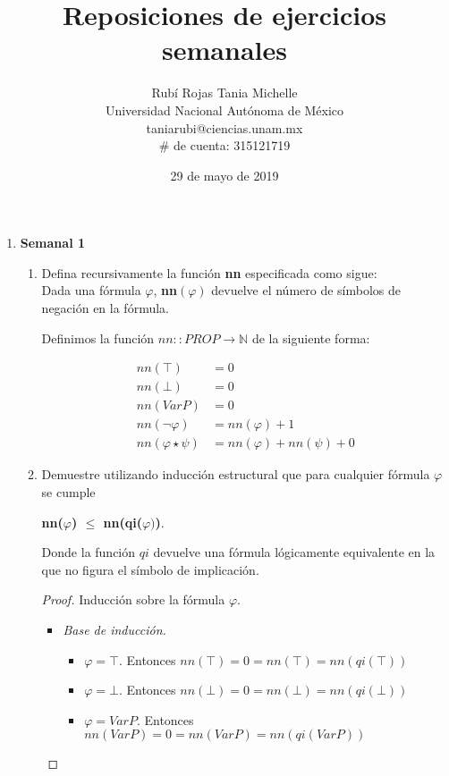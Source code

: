 \documentclass[letterpaper,12pt]{article}
\title{Reposiciones de ejercicios semanales}
\author{Rubí Rojas Tania Michelle \\
        Universidad Nacional Autónoma de México \\
        taniarubi@ciencias.unam.mx \\
        $\#$ de cuenta: 315121719}
\date{29 de mayo de 2019}
\begin{document}
\maketitle

\begin{enumerate}
    \item \textbf{Semanal 1}
    
    \begin{enumerate}
        \item Defina recursivamente la función \textbf{nn} especificada como
        sigue: \\
        Dada una fórmula $\varphi$, \textbf{nn}$(\varphi)$ devuelve el número de
        símbolos de negación en la fórmula. 

         Definimos la función $nn :: PROP \rightarrow \mathbb{N}$
        de la siguiente forma:
        
        \begin{align*}
            nn(\top) &= 0 \\
            nn(\bot) &= 0 \\
            nn(Var P) &= 0 \\
            nn(\neg \varphi) &= nn(\varphi) + 1\\
            nn(\varphi \star \psi) &= nn(\varphi) + nn(\psi) + 0
        \end{align*}
        
        \item Demuestre utilizando inducción estructural que para cualquier 
        fórmula $\varphi$ se cumple 

        \begin{center}
            \textbf{nn($\varphi$) $\leq$ nn(qi($\varphi)$)}. 
        \end{center}

        Donde la función $qi$ devuelve una fórmula lógicamente equivalente en 
        la que no figura el símbolo de implicación.

        \begin{proof}
            Inducción sobre la fórmula $\varphi$.
            
            \begin{itemize}
                \item \textit{Base de inducción.}
                
                \begin{itemize}
                    \item $\varphi = \top$. Entonces 
                    $nn(\top) = 0 = nn(\top) = nn(qi(\top))$
                    \item $\varphi = \bot$. Entonces 
                    $nn(\bot) = 0 = nn(\bot) = nn(qi(\bot))$
                    \item $\varphi = Var P$. Entonces
                    $nn(Var P) = 0 = nn(Var P) = nn(qi(Var P))$  
                \end{itemize}


\end{itemize}
\end{proof}
\end{enumerate}
\end{enumerate}
\end{document}
